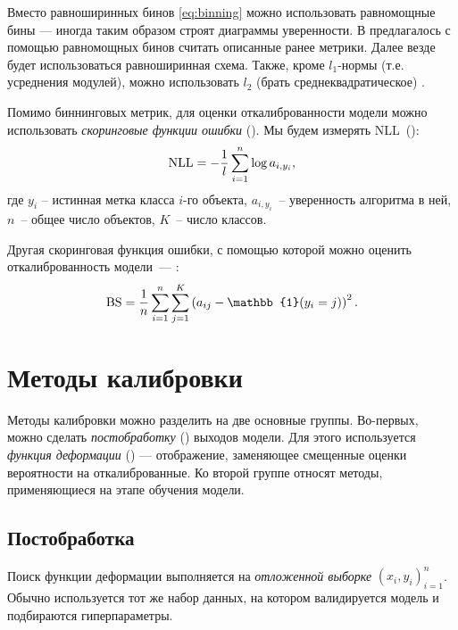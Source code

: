 \documentclass[12pt]{article}
\begin{document}
Вместо равноширинных бинов \eqref{eq:binning} можно использовать равномощные бины --- иногда таким образом строят диаграммы уверенности. В \cite{ace} предлагалось с помощью равномощных бинов считать описанные ранее метрики. Далее везде будет использоваться равноширинная схема. Также, кроме $l_1$-нормы (т.е. усреднения модулей), можно использовать $l_2$ (брать среднеквадратическое) \cite{verified_uncertainty}.

Помимо биннинговых метрик, для оценки откалиброванности модели можно использовать \emph{скоринговые функции ошибки} (). Мы будем измерять NLL~():
\begin{equation}\label{eq:nll}
    \operatorname{NLL}=-\frac{1}{l}\sum_{i=1}^n \log{a_{i, y_i}},
\end{equation}
где $y_i$ -- истинная метка класса $i$-го объекта, $a_{i, y_i}$~-- уверенность алгоритма в ней, $n$~-- общее число объектов, $K$~-- число классов.

Другая скоринговая функция ошибки, с помощью которой можно оценить откалиброванность модели~--- :
\begin{equation}
    \bs = \frac{1}{n}\sum_{i=1}^n \sum_{j=1}^K
    \left(a_{ij} - \mathbb{1}(y_i = j)\right)^2.
\end{equation}



\section{Методы калибровки}\label{sec:methods}
Методы калибровки можно разделить на две основные группы. Во-первых, можно сделать \emph{постобработку} () выходов модели. Для этого используется \emph{функция деформации} () — отображение, заменяющее смещенные оценки вероятности на откалиброванные. Ко второй группе относят методы, применяющиеся на этапе обучения модели.

\subsection{Постобработка}
Поиск функции деформации выполняется на \emph{отложенной выборке} $(x_i,y_i)_{i=1}^{n}$. Обычно используется тот же набор данных, на котором валидируется модель и подбираются гиперпараметры.
\end{document}
